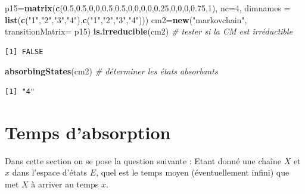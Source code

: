 \documentclass[
]{book}
\newenvironment{Shaded}{\begin{snugshade}}{\end{snugshade}}
\newcommand{\CommentTok}[1]{\textcolor[rgb]{0.56,0.35,0.01}{\textit{#1}}}
\newcommand{\DataTypeTok}[1]{\textcolor[rgb]{0.13,0.29,0.53}{#1}}
\newcommand{\DecValTok}[1]{\textcolor[rgb]{0.00,0.00,0.81}{#1}}
\newcommand{\FloatTok}[1]{\textcolor[rgb]{0.00,0.00,0.81}{#1}}
\newcommand{\KeywordTok}[1]{\textcolor[rgb]{0.13,0.29,0.53}{\textbf{#1}}}
\newcommand{\NormalTok}[1]{#1}
\newcommand{\StringTok}[1]{\textcolor[rgb]{0.31,0.60,0.02}{#1}}
\theoremstyle{definition}
\theoremstyle{definition}
\theoremstyle{definition}
\theoremstyle{remark}
\begin{document}
\begin{Shaded}
\begin{Highlighting}[]
\NormalTok{p15=}\KeywordTok{matrix}\NormalTok{(}\KeywordTok{c}\NormalTok{(}\FloatTok{0.5}\NormalTok{,}\FloatTok{0.5}\NormalTok{,}\DecValTok{0}\NormalTok{,}\DecValTok{0}\NormalTok{,}\FloatTok{0.5}\NormalTok{,}\FloatTok{0.5}\NormalTok{,}\DecValTok{0}\NormalTok{,}\DecValTok{0}\NormalTok{,}\DecValTok{0}\NormalTok{,}\DecValTok{0}\NormalTok{,}\FloatTok{0.25}\NormalTok{,}\DecValTok{0}\NormalTok{,}\DecValTok{0}\NormalTok{,}\DecValTok{0}\NormalTok{,}\FloatTok{0.75}\NormalTok{,}\DecValTok{1}\NormalTok{), }\DataTypeTok{nc=}\DecValTok{4}\NormalTok{, }
           \DataTypeTok{dimnames =} \KeywordTok{list}\NormalTok{(}\KeywordTok{c}\NormalTok{(}\StringTok{"1"}\NormalTok{,}\StringTok{"2"}\NormalTok{,}\StringTok{"3"}\NormalTok{,}\StringTok{"4"}\NormalTok{),}\KeywordTok{c}\NormalTok{(}\StringTok{"1"}\NormalTok{,}\StringTok{"2"}\NormalTok{,}\StringTok{"3"}\NormalTok{,}\StringTok{"4"}\NormalTok{)))}
\NormalTok{cm2=}\KeywordTok{new}\NormalTok{(}\StringTok{"markovchain"}\NormalTok{, }\DataTypeTok{transitionMatrix=}\NormalTok{ p15)}
\KeywordTok{is.irreducible}\NormalTok{(cm2)  }\CommentTok{# tester si la CM est irréductible}
\end{Highlighting}
\end{Shaded}

\begin{verbatim}
[1] FALSE
\end{verbatim}

\begin{Shaded}
\begin{Highlighting}[]
\KeywordTok{absorbingStates}\NormalTok{(cm2) }\CommentTok{# déterminer les états absorbants}
\end{Highlighting}
\end{Shaded}

\begin{verbatim}
[1] "4"
\end{verbatim}

\hypertarget{temps-dabsorption}{%
\section{Temps d'absorption}\label{temps-dabsorption}}

Dans cette section on se pose la question suivante : Etant donné une chaîne \(X\) et \(x\) dans l'espace d'états \(E\), quel est le temps moyen (éventuellement infini) que met \(X\) à arriver au temps \(x\).
\end{document}
